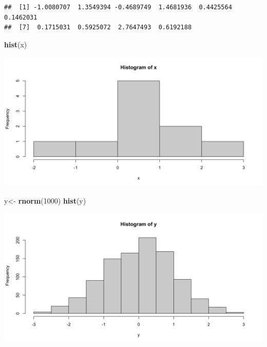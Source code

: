 \documentclass[]{book}
\newenvironment{Shaded}{\begin{snugshade}}{\end{snugshade}}
\newcommand{\DecValTok}[1]{\textcolor[rgb]{0.00,0.00,0.81}{#1}}
\newcommand{\KeywordTok}[1]{\textcolor[rgb]{0.13,0.29,0.53}{\textbf{#1}}}
\newcommand{\NormalTok}[1]{#1}
\newcommand{\StringTok}[1]{\textcolor[rgb]{0.31,0.60,0.02}{#1}}
\begin{document}
\begin{verbatim}
##  [1] -1.0080707  1.3549394 -0.4689749  1.4681936  0.4425564  0.1462031
##  [7]  0.1715031  0.5925072  2.7647493  0.6192188
\end{verbatim}

\begin{Shaded}
\begin{Highlighting}[]
\KeywordTok{hist}\NormalTok{(x)}
\end{Highlighting}
\end{Shaded}

\begin{center}\includegraphics{figure/unnamed-chunk-18-1} \end{center}

\begin{Shaded}
\begin{Highlighting}[]
\NormalTok{y<-}\StringTok{ }\KeywordTok{rnorm}\NormalTok{(}\DecValTok{1000}\NormalTok{)}
\KeywordTok{hist}\NormalTok{(y)}
\end{Highlighting}
\end{Shaded}

\begin{center}\includegraphics{figure/unnamed-chunk-19-1} \end{center}
\end{document}
